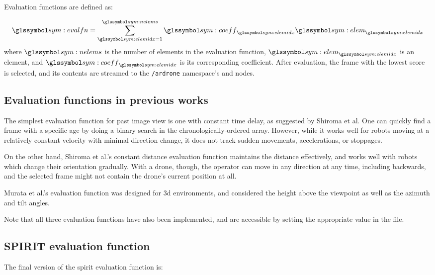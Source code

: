     Evaluation functions are defined as:

    \begin{equation}
      \sym{evalfn} = \sum_{\sym{elemidx}=1}^{\sym{nelems}}{\sym{coeff}_{\sym{elemidx}}\sym{elem}_{\sym{elemidx}}}
    \end{equation}
    where $\sym{nelems}$ is the number of elements in the evaluation function, $\sym{elem}_{\sym{elemidx}}$ is an element, and $\sym{coeff}_{\sym{elemidx}}$ is its corresponding coefficient.
    After evaluation, the frame with the lowest score is selected, and its contents are streamed to the \texttt{/ardrone} namespace's \texttt{} and \texttt{} nodes.

    \subsection{Evaluation functions in previous works}
      The simplest evaluation function for past image view is one with constant time delay, as suggested by Shiroma et al.\cite{shiroma2004}
      One can quickly find a frame with a specific age by doing a binary search in the chronologically-ordered array.
      However, while it works well for robots moving at a relatively constant velocity with minimal direction change, it does not track sudden movements, accelerations, or stoppages.

      On the other hand, Shiroma et al.'s constant distance evaluation function\cite{shiroma2004} maintains the distance effectively, and works well with robots which change their orientation gradually.
      With a drone, though, the operator can move in any direction at any time, including backwards, and the selected frame might not contain the drone's current position at all.

      Murata et al.'s evaluation function was designed for \gls{3d} environments,\cite{murata2014} and considered the height above the viewpoint as well as the azimuth and tilt angles.

      Note that all three evaluation functions have also been implemented, and are accessible by setting the appropriate value in the \texttt{} file.

    \subsection{SPIRIT evaluation function}
      The final version of the \gls{spirit} evaluation function is:

